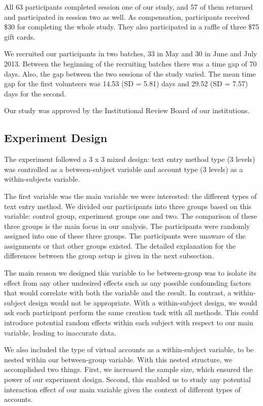 \documentclass[conference]{IEEEtran}
\begin{document}
All 63 participants completed session one of our study, and 57 of them returned and participated in session two as well.
As compensation, participants received \$30 for completing the whole study. They also participated in a raffle of three \$75 gift cards.

We recruited our participants in two batches, 33 in May and 30 in June and July 2013.
Between the beginning of the recruiting batches there was a time gap of 70 days. Also, the gap between the two sessions of the study varied. The mean time gap for the first volunteers was 14.53 (SD = 5.81) days and 29.52 (SD = 7.57) days for the second.

Our study was approved by the Institutional Review Board of our institutions.

\subsection{Experiment Design}

The experiment followed a 3 x 3 mixed design: text entry method type (3 levels) was controlled as a between-subject variable and account type (3 levels) as a within-subjects variable.

The first variable was the main variable we were interested: the different types of text entry method. We divided our participants into three groups based on this variable: control group, experiment groups one and two. The comparison of these three groups is the main focus in our analysis. The participants were randomly assigned into one of these three groups. The participants were unaware of the assignments or that other groups existed. The detailed explanation for the differences between the group setup is given in the next subsection.

The main reason we designed this variable to be between-group was to isolate its effect from any other undesired effects such as any possible confounding factors that would correlate with both the variable and the result. In contrast, a within-subject design would not be appropriate. With a within-subject design, we would ask each participant perform the same creation task with all methods. This could introduce potential random effects within each subject with respect to our main variable, leading to inaccurate data.

We also included the type of virtual accounts as a within-subject variable, to be nested within our between-group variable. With this nested structure, we accomplished two things. First, we increased the sample size, which ensured the power of our experiment design. Second, this enabled us to study any potential interaction effect of our main variable given the context of different types of accounts.
\end{document}
